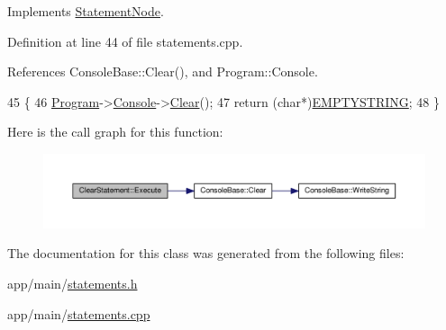 Implements \hyperlink{classStatementNode_a721589622c930c010927b9a9c55b173e}{Statement\+Node}.



Definition at line 44 of file statements.\+cpp.



References Console\+Base\+::\+Clear(), and Program\+::\+Console.


\begin{DoxyCode}
45 \{
46     \hyperlink{classProgram}{Program}->\hyperlink{classProgram_a7edba60e839230f20ce29716567bc892}{Console}->\hyperlink{classConsoleBase_a2f5aa6f61f903a098c315640e64815c6}{Clear}();
47     \textcolor{keywordflow}{return} (\textcolor{keywordtype}{char}*)\hyperlink{platform_8h_a79ff1b9ff232b38c8b5600659e6bc7c2}{EMPTYSTRING};
48 \}
\end{DoxyCode}


Here is the call graph for this function\+:\nopagebreak
\begin{figure}[H]
\begin{center}
\leavevmode
\includegraphics[width=350pt]{classClearStatement_ad01255515180fd5271c491386df560a8_cgraph}
\end{center}
\end{figure}




The documentation for this class was generated from the following files\+:\begin{DoxyCompactItemize}
\item 
app/main/\hyperlink{statements_8h}{statements.\+h}\item 
app/main/\hyperlink{statements_8cpp}{statements.\+cpp}\end{DoxyCompactItemize}

